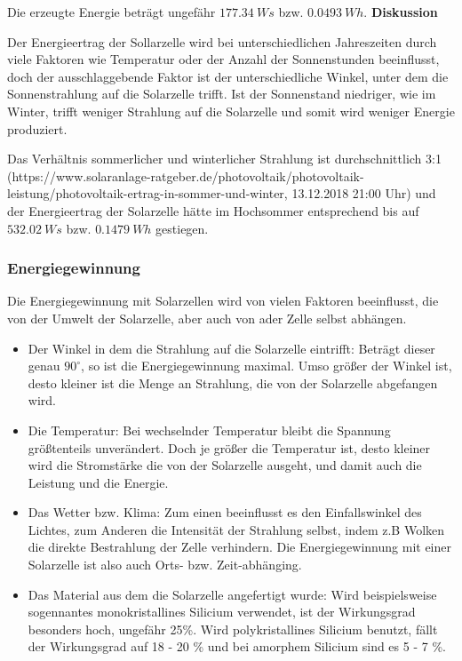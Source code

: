        Die erzeugte Energie beträgt ungefähr $177.34\ Ws$ bzw. $0.0493\ Wh$.
        \vspace{4mm}
        \newline
        \textbf{Diskussion}
        \newline
        \par Der Energieertrag der Sollarzelle wird bei unterschiedlichen Jahreszeiten durch viele Faktoren wie Temperatur oder der Anzahl der Sonnenstunden beeinflusst, doch der ausschlaggebende Faktor ist der unterschiedliche Winkel, unter dem die Sonnenstrahlung auf die Solarzelle trifft. Ist der Sonnenstand niedriger, wie im Winter, trifft weniger Strahlung auf die Solarzelle und somit wird weniger Energie produziert.
        \par Das Verhältnis sommerlicher und winterlicher Strahlung ist durchschnittlich 3:1 (https://www.solaranlage-ratgeber.de/photovoltaik/photovoltaik-leistung/photovoltaik-ertrag-in-sommer-und-winter, 13.12.2018 21:00 Uhr) und der Energieertrag der Solarzelle hätte im Hochsommer entsprechend bis auf $532.02\ Ws$ bzw. $0.1479\ Wh$ gestiegen.
        
    \subsubsection{Energiegewinnung}                                    %
        \par Die Energiegewinnung mit Solarzellen wird von vielen Faktoren beeinflusst, die von der Umwelt der Solarzelle, aber auch von ader Zelle selbst abhängen.
        \begin{itemize}
            \item Der Winkel in dem die Strahlung auf die Solarzelle eintrifft: Beträgt dieser genau $90^{\circ}$, so ist die Energiegewinnung maximal. Umso größer der Winkel ist, desto kleiner ist die Menge an Strahlung, die von der Solarzelle abgefangen wird.
            \item Die Temperatur: Bei wechselnder Temperatur bleibt die Spannung größtenteils unverändert. Doch je größer die Temperatur ist, desto kleiner wird die Stromstärke die von der Solarzelle ausgeht, und damit auch die Leistung und die Energie.
            \item Das Wetter bzw. Klima: Zum einen beeinflusst es den Einfallswinkel des Lichtes, zum Anderen die Intensität der Strahlung selbst, indem z.B Wolken die direkte Bestrahlung der Zelle verhindern. Die Energiegewinnung mit einer Solarzelle ist also auch Orts- bzw. Zeit-abhänging.
            \item Das Material aus dem die Solarzelle angefertigt wurde: Wird beispielsweise sogennantes monokristallines Silicium verwendet, ist der Wirkungsgrad besonders hoch, ungefähr 25\%. Wird polykristallines Silicium benutzt, fällt der Wirkungsgrad auf 18 - 20 \% und bei amorphem Silicium sind es 5 - 7 \%. 
        \end{itemize}
